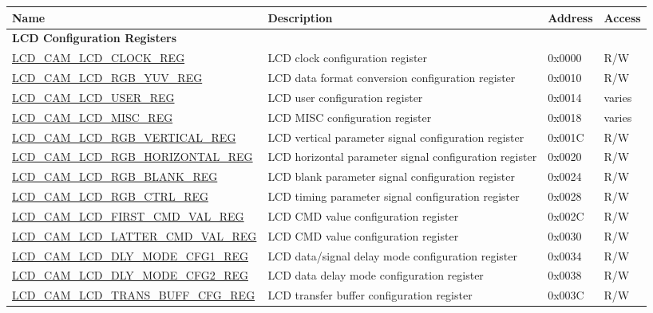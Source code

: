 \begin{longtable}{ | p{6.4cm} | p{6.8cm} | p{1.3cm} | p{1cm} | }
\hline\rowcolor{lightgray}
\textbf{Name} & \textbf{Description} &  \textbf{Address} & \textbf{Access}  \\ \hline
\endhead
\multicolumn{4}{|l|}{\textbf{LCD Configuration Registers}} \\ \hline
\hyperref[regdesc:LCDCAMLCDCLOCKREG]{LCD\_CAM\_LCD\_CLOCK\_REG} & LCD clock configuration register & 0x0000 & R/W \\ \hline
\hyperref[regdesc:LCDCAMLCDRGBYUVREG]{LCD\_CAM\_LCD\_RGB\_YUV\_REG} & LCD data format conversion configuration register & 0x0010 & R/W \\ \hline
\hyperref[regdesc:LCDCAMLCDUSERREG]{LCD\_CAM\_LCD\_USER\_REG} & LCD user configuration register & 0x0014 & varies \\ \hline
\hyperref[regdesc:LCDCAMLCDMISCREG]{LCD\_CAM\_LCD\_MISC\_REG} & LCD MISC configuration register & 0x0018 & varies \\ \hline
\hyperref[regdesc:LCDCAMLCDRGBVERTICALREG]{LCD\_CAM\_LCD\_RGB\_VERTICAL\_REG} & LCD vertical parameter signal configuration register & 0x001C & R/W \\ \hline
\hyperref[regdesc:LCDCAMLCDRGBHORIZONTALREG]{LCD\_CAM\_LCD\_RGB\_HORIZONTAL\_REG} & LCD horizontal parameter signal configuration register & 0x0020 & R/W \\ \hline
\hyperref[regdesc:LCDCAMLCDRGBBLANKREG]{LCD\_CAM\_LCD\_RGB\_BLANK\_REG} & LCD blank parameter signal configuration register & 0x0024 & R/W \\ \hline
\hyperref[regdesc:LCDCAMLCDRGBCTRLREG]{LCD\_CAM\_LCD\_RGB\_CTRL\_REG} & LCD timing parameter signal configuration register & 0x0028 & R/W \\ \hline
\hyperref[regdesc:LCDCAMLCDFIRSTCMDVALREG]{LCD\_CAM\_LCD\_FIRST\_CMD\_VAL\_REG} & LCD CMD value configuration register & 0x002C & R/W \\ \hline
\hyperref[regdesc:LCDCAMLCDLATTERCMDVALREG]{LCD\_CAM\_LCD\_LATTER\_CMD\_VAL\_REG} & LCD CMD value configuration register & 0x0030 & R/W \\ \hline
\hyperref[regdesc:LCDCAMLCDDLYMODECFG1REG]{LCD\_CAM\_LCD\_DLY\_MODE\_CFG1\_REG} & LCD data/signal delay mode configuration register & 0x0034 & R/W \\ \hline
\hyperref[regdesc:LCDCAMLCDDLYMODECFG2REG]{LCD\_CAM\_LCD\_DLY\_MODE\_CFG2\_REG} & LCD data delay mode configuration register & 0x0038 & R/W \\ \hline
\hyperref[regdesc:LCDCAMLCDTRANSBUFFCFGREG]{LCD\_CAM\_LCD\_TRANS\_BUFF\_CFG\_REG} & LCD transfer buffer configuration register & 0x003C & R/W \\ \hline

\end{longtable}
